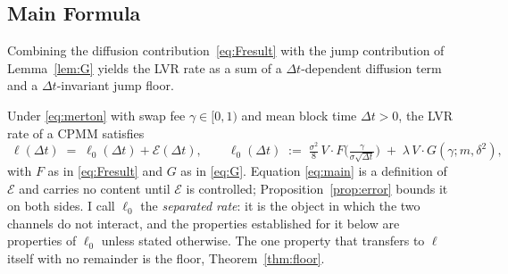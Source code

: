 \documentclass[runningheads]{llncs}
\newcommand{\dt}{\Delta t}
\newcommand{\1}{\mathbf{1}}
\begin{document}
\subsection{Main Formula}

Combining the diffusion contribution~\eqref{eq:Fresult} with the jump contribution of Lemma~\ref{lem:G} yields the LVR rate as a sum of a $\dt$-dependent diffusion term and a $\dt$-invariant jump floor.

\begin{theorem}\label{thm:fee}
Under \eqref{eq:merton} with swap fee $\gamma \in [0,1)$ and mean block time $\dt > 0$, the LVR rate of a CPMM satisfies
\begin{equation}\label{eq:main}
\boxed{\;\ell(\dt) \;=\; \ell_0(\dt) + \mathcal{E}(\dt), \qquad \ell_0(\dt) \;:=\; \tfrac{\sigma^2}{8}\,V \cdot F\!\Big(\tfrac{\gamma}{\sigma\sqrt{\dt}}\Big) \;+\; \lambda \, V \cdot G(\gamma; m, \delta^2),\;}
\end{equation}
with $F$ as in \eqref{eq:Fresult} and $G$ as in \eqref{eq:G}. Equation \eqref{eq:main} is a definition of $\mathcal{E}$ and carries no content until $\mathcal{E}$ is controlled; Proposition~\ref{prop:error} bounds it on both sides. I call $\ell_0$ the \emph{separated rate}: it is the object in which the two channels do not interact, and the properties established for it below are properties of $\ell_0$ unless stated otherwise. The one property that transfers to $\ell$ itself with no remainder is the floor, Theorem~\ref{thm:floor}.
\end{theorem}
\end{document}
